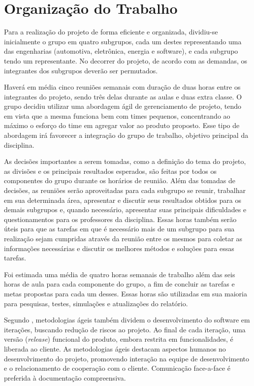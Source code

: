\chapter[Organização do Trabalho]{Organização do Trabalho}

Para a realização do projeto de forma eficiente e organizada, dividiu-se inicialmente o grupo em quatro subgrupos, cada um destes representando uma das 
engenharias (automotiva, eletrônica, energia e software), e cada subgrupo tendo um representante. No decorrer do projeto, de acordo com as demandas, os 
integrantes dos subgrupos deverão ser permutados. 

Haverá em média cinco reuniões semanais com duração de duas horas entre os integrantes do projeto, sendo três delas durante as aulas e duas extra classe.
O grupo decidiu utilizar uma abordagem ágil de gerenciamento de projeto, tendo em vista que a mesma funciona bem com times pequenos, concentrando ao máximo
o esforço do time em agregar valor ao produto proposto. Esse tipo de abordagem irá favorecer a integração do grupo de trabalho, objetivo principal da disciplina.

As decisões importantes a serem tomadas, como a definição do tema do projeto, as divisões e os principais resultados esperados, são feitas por 
todos os componentes do grupo durante os horários de reunião. Além das tomadas de decisões, as reuniões serão aproveitadas para cada subgrupo se reunir, 
trabalhar em sua determinada área, apresentar e discutir seus resultados obtidos para os demais subgrupos e, quando necessário, apresentar suas principais 
dificuldades e questionamentos para os professores da disciplina. Essas horas também serão úteis para que as tarefas em que é necessário mais de um subgrupo 
para sua realização sejam cumpridas através da reunião entre os mesmos para coletar as informações necessárias e discutir os melhores métodos e soluções para 
essas tarefas.

Foi estimada uma média de quatro horas semanais de trabalho além das seis horas de aula para cada componente do grupo, a fim de concluir as tarefas e metas 
propostas para cada um desses. Essas horas são utilizadas em sua maioria para pesquisas, testes, simulações e atualizações do relatório. 

Segundo \cite{XPxRUP2006}, metodologias ágeis também dividem o desenvolvimento do software em iterações, buscando redução de riscos ao projeto. Ao final de cada iteração, uma versão (\textit{release}) funcional do produto, embora restrita em funcionalidades, é liberada ao cliente. As metodologias ágeis destacam aspectos humanos no desenvolvimento do projeto, promovendo interação na equipe de desenvolvimento e o relacionamento de cooperação com o cliente. Comunicação face-a-face é preferida à documentação compreensiva.

